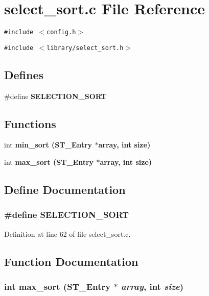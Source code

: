 \section{select\_\-sort.c File Reference}
\label{select__sort_8c}
{\tt \#include $<$config.h$>$}\par
{\tt \#include $<$library/select\_\-sort.h$>$}\par
\subsection*{Defines}
\begin{CompactItemize}
\item 
\#define \bf{SELECTION\_\-SORT}
\end{CompactItemize}
\subsection*{Functions}
\begin{CompactItemize}
\item 
int \bf{min\_\-sort} (\bf{ST\_\-Entry} $\ast$array, int size)
\item 
int \bf{max\_\-sort} (\bf{ST\_\-Entry} $\ast$array, int size)
\end{CompactItemize}


\subsection{Define Documentation}
\subsubsection{\setlength{\rightskip}{0pt plus 5cm}\#define SELECTION\_\-SORT}\label{select__sort_8c_5d21a429e73e7b6a02e129f3fb868ca4}




Definition at line 62 of file select\_\-sort.c.

\subsection{Function Documentation}
\subsubsection{\setlength{\rightskip}{0pt plus 5cm}int max\_\-sort (\bf{ST\_\-Entry} $\ast$ {\em array}, int {\em size})}\label{select__sort_8c_48ee672f8284eb9dcd9692a43bb5e681}




